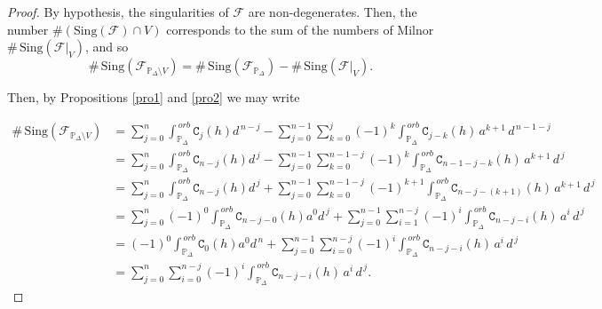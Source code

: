\documentclass[10pt,a4paper]{amsart}
\begin{document}
\begin{proof} By hypothesis, the singularities of $\mathcal{F}$ are non-degenerates. Then, the number 
$\#\left(\mathrm{Sing}(\mathcal{F})\cap V\right)$
corresponds to the sum of the numbers of Milnor $\#\,\mathrm{Sing}(\mathcal{F}|_V)$, and so 
$$\#\,\mathrm{Sing}(\mathcal{F}_{\mathbb{P}_{\Delta}\setminus V})=
\#\,\mathrm{Sing}(\mathcal{F}_{\mathbb{P}_{\Delta}})-
\#\,\mathrm{Sing}(\mathcal{F}|_{V}).$$

\noindent Then, by Propositions \ref{pro1} and \ref{pro2} we may write 

\begin{align*}
\#\,\mathrm{Sing}(\mathcal{F}_{\mathbb{P}_{\Delta}\setminus V})
&=\sum_{j=0}^{n}\int_{\mathbb{P}_{\Delta}}^{\,orb}\texttt{C}_j(h)d^{\,n-j}
-\sum_{j=0}^{n-1}\sum_{k=0}^{j}(-1)^{k}\int_{\mathbb{P}_{\Delta}}^{\,orb}\texttt{C}_{j-k}(h)\,a^{k+1}\,d^{\,n-1-j}\\
&=\sum_{j=0}^{n}\int_{\mathbb{P}_{\Delta}}^{\,orb}\texttt{C}_{n-j}(h)d^{\,j}
-\sum_{j=0}^{n-1}\sum_{k=0}^{n-1-j}(-1)^{k}\int_{\mathbb{P}_{\Delta}}^{\,orb}\texttt{C}_{n-1-j-k}(h)\,a^{k+1}\,d^{\,j}\\
&=\sum_{j=0}^{n}\int_{\mathbb{P}_{\Delta}}^{\,orb}\texttt{C}_{n-j}(h)d^{\,j}
+\sum_{j=0}^{n-1}\sum_{k=0}^{n-1-j}(-1)^{k+1}\int_{\mathbb{P}_{\Delta}}^{\,orb}\texttt{C}_{n-j-(k+1)}(h)\,a^{k+1}\,d^{\,j}\\
&=\sum_{j=0}^{n}(-1)^0\int_{\mathbb{P}_{\Delta}}^{\,orb}\texttt{C}_{n-j-0}(h)a^0d^{\,j}
+\sum_{j=0}^{n-1}\sum_{i=1}^{n-j}(-1)^{i}\int_{\mathbb{P}_{\Delta}}^{\,orb}\texttt{C}_{n-j-i}(h)\,a^{i}\,d^{\,j}\\
&=(-1)^0\int_{\mathbb{P}_{\Delta}}^{\,orb}\texttt{C}_{0}(h)a^0d^{\,n}
+\sum_{j=0}^{n-1}\sum_{i=0}^{n-j}(-1)^{i}\int_{\mathbb{P}_{\Delta}}^{\,orb}\texttt{C}_{n-j-i}(h)\,a^{i}\,d^{\,j}\\
&=\sum_{j=0}^{n}\sum_{i=0}^{n-j}(-1)^{i}\int_{\mathbb{P}_{\Delta}}^{\,orb}\texttt{C}_{n-j-i}(h)\,a^{i}\,d^{\,j}.
\end{align*}
\end{proof}
\end{document}
